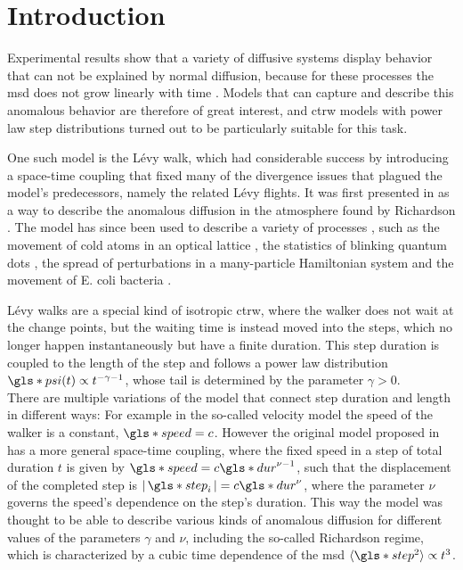 \chapter{Introduction}

Experimental results show that a variety of diffusive systems display behavior that can not be explained by normal diffusion, because for these processes the \gls*{msd} does not grow linearly with time
\cite{xu2011,sagi2012,marty2005,amblard1996}
. 
Models that can capture and describe this anomalous behavior are therefore of great interest, and \gls*{ctrw} models with power law step distributions turned out to be particularly suitable for this task.

One such model is the L\'evy walk, which had considerable success by introducing a space-time coupling that fixed many of the divergence issues that plagued the model's predecessors, namely the related L\'evy flights. It was first presented in 
\cite{shlesinger1987} 
as a way to describe the anomalous diffusion in the atmosphere found by Richardson 
\cite{richardson}. 
The model has since been used to describe a variety of processes 
\cite{lwreview} ,
such as the movement of cold atoms in an optical lattice 
\cite{marksteiner1996}, 
the statistics of blinking quantum dots 
\cite{jung2002}, 
the spread of perturbations in a many-particle Hamiltonian system 
\cite{zaburdaev2011perturbation} 
and the movement of E. coli bacteria 
\cite{korobkova2004}.

L\'evy walks are a special kind of isotropic \gls*{ctrw}, where the walker does not wait at the change points, but the waiting time is instead moved into the steps, which no longer happen instantaneously but have a finite duration. This step duration is coupled to the length of the step and follows a power law distribution $\gls*{psi}(t) \propto t^{-\gamma-1}$, whose tail is determined by the parameter $\gamma>0$. \\
There are multiple variations of the model that connect step duration and length in different ways: For example in the so-called velocity model the speed of the walker is a constant, $\gls*{speed} = c$. However the original model proposed in 
\cite{shlesinger1987}
has a more general space-time coupling, where the fixed speed in a step of total duration $t$ is given by $\gls*{speed} = c  \gls*{dur}^{\nu-1}$, such that the displacement of the completed step is $\abs{\gls*{step}_i} = c \gls*{dur}^{\nu}$, where the parameter $\nu$ governs the speed's dependence on the step's duration. This way the model was thought to be able to describe various kinds of anomalous diffusion for different values of the parameters $\gamma$ and $\nu$, including the so-called Richardson regime, which is characterized by a cubic time dependence of the \gls*{msd} $\mean{\gls*{step}^2} \propto t^3$. 

